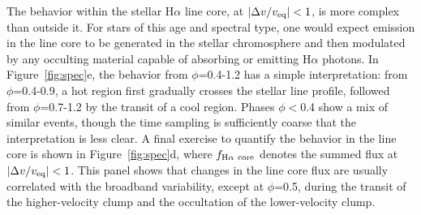 \documentclass{nature3}
\begin{document}
The behavior within the stellar H$\alpha$ line core, at $|\Delta v /
v_{\rm eq}|<1$, is more complex than outside it.  For stars of
this age and spectral type, one would expect emission in the line core
to be generated in the stellar chromosphere
and then modulated by any occulting material capable of absorbing or
emitting H$\alpha$ photons.  In Figure~\ref{fig:spec}e, the behavior from
$\phi$=0.4-1.2 has a simple interpretation: from $\phi$=0.4-0.9, a hot
region first gradually crosses the stellar line profile, followed from
$\phi$=0.7-1.2 by the transit of a cool region.  Phases $\phi$$<$0.4
show a mix of similar events, though the time sampling is
sufficiently coarse that the interpretation is less clear.  A final
exercise to quantify the behavior in the line core is shown in
Figure~\ref{fig:spec}d, where $f_{\rm H\alpha\ core}$ denotes the
summed flux at $|\Delta v / v_{\rm eq}|<1$.  This panel shows that
changes in the line core flux are usually correlated with the
broadband variability, except at $\phi$=0.5, during the transit of the
higher-velocity clump and the occultation of the lower-velocity clump.
\end{document}
